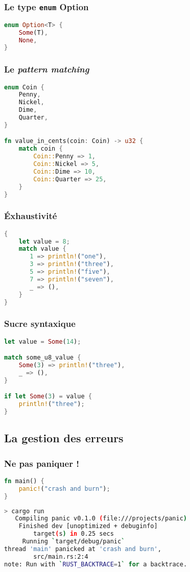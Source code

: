 \begin{frame}[fragile]
  \frametitle{Le type \texttt{enum} Option}
  \begin{lstlisting}[language=rust]
enum Option<T> {
    Some(T),
    None,
}
  \end{lstlisting}
\end{frame}

\begin{frame}[fragile]
  \frametitle{Le \textit{pattern matching}}
  \begin{lstlisting}[language=rust, basicstyle=\small{}]
enum Coin {
    Penny,
    Nickel,
    Dime,
    Quarter,
}

fn value_in_cents(coin: Coin) -> u32 {
    match coin {
        Coin::Penny => 1,
        Coin::Nickel => 5,
        Coin::Dime => 10,
        Coin::Quarter => 25,
    }
}
  \end{lstlisting}
\end{frame}

\begin{frame}[fragile]
  \frametitle{Éxhaustivité}
  \begin{lstlisting}[language=rust]
{
    let value = 8;
    match value {
       1 => println!("one"),
       3 => println!("three"),
       5 => println!("five"),
       7 => println!("seven"),
       _ => (),
    }
}
  \end{lstlisting}
\end{frame}


\begin{frame}[fragile]
  \frametitle{Sucre syntaxique}
  \begin{lstlisting}[language=rust]
let value = Some(14);

match some_u8_value {
    Some(3) => println!("three"),
    _ => (),
}

if let Some(3) = value {
    println!("three");
}
  \end{lstlisting}
\end{frame}

\subsection{La gestion des erreurs}

\begin{frame}[fragile]
  \frametitle{Ne pas paniquer !}
  \begin{lstlisting}[language=rust]
fn main() {
    panic!("crash and burn");
}
  \end{lstlisting}
  \begin{lstlisting}[language=bash, basicstyle=\small{}]
> cargo run
   Compiling panic v0.1.0 (file:///projects/panic)
    Finished dev [unoptimized + debuginfo]
        target(s) in 0.25 secs
     Running `target/debug/panic`
thread 'main' panicked at 'crash and burn',
        src/main.rs:2:4
note: Run with `RUST_BACKTRACE=1` for a backtrace.
  \end{lstlisting}
\end{frame}

